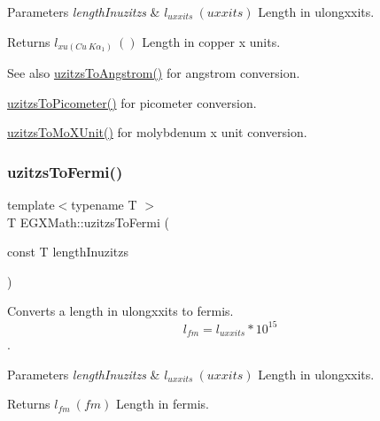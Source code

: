 \begin{DoxyParams}{Parameters}
{\em length\+Inuzitzs} & $ l_{uxxits}\ (uxxits)$ Length in ulongxxits. \\
\hline
\end{DoxyParams}
\begin{DoxyReturn}{Returns}
$ l_{xu(Cu\ K\alpha_1)}\ ()$ Length in copper x units. 
\end{DoxyReturn}
\begin{DoxySeeAlso}{See also}
\mbox{\hyperlink{group___e_g_x_math-_conversions-_length_conversions-uzitzs-_non-_s_i_gaaaecee65b1db5abcc71e18526e7073eb}{uzitzs\+To\+Angstrom()}} for angstrom conversion. 

\mbox{\hyperlink{group___e_g_x_math-_conversions-_length_conversions-uzitzs-_s_i_ga48c60a4876ac426d1717096263648a4d}{uzitzs\+To\+Picometer()}} for picometer conversion. 

\mbox{\hyperlink{group___e_g_x_math-_conversions-_length_conversions-uzitzs-_non-_s_i_ga64b556911b0bb06cf315aa02f5e2d379}{uzitzs\+To\+Mo\+X\+Unit()}} for molybdenum x unit conversion. 
\end{DoxySeeAlso}
\mbox{\label{group___e_g_x_math-_conversions-_length_conversions-uzitzs-_non-_s_i_ga920cd8aae6bc9f70faa49a6a5c988040}} 
\subsubsection{\texorpdfstring{uzitzs\+To\+Fermi()}{uzitzsToFermi()}}
{\footnotesize\ttfamily template$<$typename T $>$ \\
T E\+G\+X\+Math\+::uzitzs\+To\+Fermi (\begin{DoxyParamCaption}\item[{const T}]{length\+Inuzitzs }\end{DoxyParamCaption})}



Converts a length in ulongxxits to fermis. \[ l_{fm}=l_{uxxits} * 10^{15} \]. 


\begin{DoxyParams}{Parameters}
{\em length\+Inuzitzs} & $ l_{uxxits}\ (uxxits)$ Length in ulongxxits. \\
\hline
\end{DoxyParams}
\begin{DoxyReturn}{Returns}
$ l_{fm}\ (fm)$ Length in fermis. 
\end{DoxyReturn}
\mbox{\label{group___e_g_x_math-_conversions-_length_conversions-uzitzs-_non-_s_i_ga695a8fd8870537930d6378e99ad2aa9f}} 
